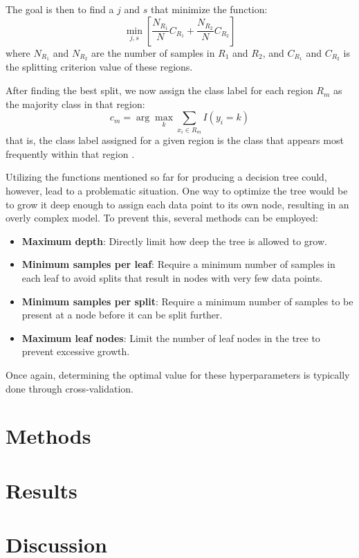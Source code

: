 \documentclass[english,11pt,a4paper,titlepage]{article}
\begin{document}
	The goal is then to find a \( j \) and \( s \) that minimize the function:
	\begin{equation}
		\min_{j,s} \left[\frac{N_{R_1}}{N}C_{R_1} + \frac{N_{R_2}}{N}C_{R_2}\right]
	\end{equation}
	where \( N_{R_1} \) and \( N_{R_2} \) are the number of samples in \( R_1 \) and \( R_2 \), and \( C_{R_1} \) and \( C_{R_2} \) is the splitting criterion value of these regions.
	
	After finding the best split, we now assign the class label for each region \( R_m \) as the majority class in that region:
	\begin{equation}
		c_m = \arg \max_k \sum_{x_i \in R_m} I(y_i = k)
	\end{equation}
	that is, the class label assigned for a given region is the class that appears most frequently within that region \cite{hastieElementsStatisticalLearning2009,sohilIntroductionStatisticalLearning2022}.
	
	Utilizing the functions mentioned so far for producing a decision tree could, however, lead to a problematic situation. One way to optimize the tree would be to grow it deep enough to assign each data point to its own node, resulting in an overly complex model. To prevent this, several methods can be employed:
	\begin{itemize}
		\item \textbf{Maximum depth}: Directly limit how deep the tree is allowed to grow.
		\item \textbf{Minimum samples per leaf}: Require a minimum number of samples in each leaf to avoid splits that result in nodes with very few data points.
		\item \textbf{Minimum samples per split}: Require a minimum number of samples to be present at a node before it can be split further.
		\item \textbf{Maximum leaf nodes}: Limit the number of leaf nodes in the tree to prevent excessive growth.
	\end{itemize}
	
	Once again, determining the optimal value for these hyperparameters is typically done through cross-validation.
	
	
\section*{Methods}

\section*{Results}

\section*{Discussion}

\newpage
\printbibliography
\end{document}
